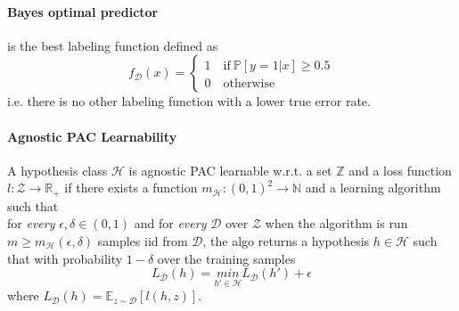 \paragraph{Bayes optimal predictor} is the best labeling function defined as
\[
	f_{\mathcal{D}}(x) = 
        \begin{cases} 
            \text{1} \quad \text{if} ~\mathbb{P}[y=1 | x] \geq 0.5\\
            \text{0} \quad \text{otherwise}
        \end{cases}
\]
i.e. there is no other labeling function with a lower true error rate.

\paragraph{Agnostic PAC Learnability} A hypothesis class $\mathcal{H}$ is agnostic PAC learnable w.r.t. a set $\mathbb{Z}$ and a loss function $l: \mathcal{Z} \to \mathbb{R}_+$ if there exists a function $m_\mathcal{H}: (0,1)^2 \to \mathbb{N}$ and a learning algorithm such that\\
for \textit{every} $\epsilon, \delta \in (0,1)$ and for  \textit{every} $\mathcal{D}$ over $\mathcal{Z}$ when the algorithm is run $m \geq m_\mathcal{H}(\epsilon, \delta)$ samples iid from $\mathcal{D}$, the algo returns a hypothesis $h \in \mathcal{H}$ such that with probability $1 - \delta$ over the training samples
\[
	L_\mathcal{D}(h) = \underset{h' \in \mathcal{H}}{min} L_\mathcal{D}(h') + \epsilon
\]
where $L_\mathcal{D}(h) = \mathbb{E}_{z\sim\mathcal{D}}[l(h,z)]$.